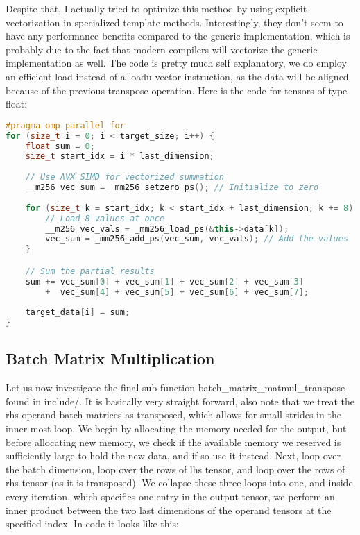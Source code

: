 \documentclass[sigconf]{acmart}
\renewcommand{\texttt}[1]{\begingroup\ttfamily\sloppy\hbadness=10000 #1\endgroup}
\begin{document}
Despite that, I actually tried to optimize this method by using explicit vectorization in specialized template methods. Interestingly, they don't seem to have any performance benefits compared to the generic implementation, which is probably due to the fact that modern compilers will vectorize the generic implementation as well. The code is pretty much self explanatory, we do employ an efficient \texttt{load} instead of a \texttt{loadu} vector instruction, as the data will be aligned because of the previous transpose operation. Here is the code for tensors of type \texttt{float}:

\begin{lstlisting}[language=C++]
#pragma omp parallel for
for (size_t i = 0; i < target_size; i++) {
    float sum = 0;
    size_t start_idx = i * last_dimension;
    
    // Use AVX SIMD for vectorized summation
    __m256 vec_sum = _mm256_setzero_ps(); // Initialize to zero
    
    for (size_t k = start_idx; k < start_idx + last_dimension; k += 8) {
        // Load 8 values at once
        __m256 vec_vals = _mm256_load_ps(&this->data[k]);
        vec_sum = _mm256_add_ps(vec_sum, vec_vals); // Add the values
    }

    // Sum the partial results
    sum += vec_sum[0] + vec_sum[1] + vec_sum[2] + vec_sum[3]
        +  vec_sum[4] + vec_sum[5] + vec_sum[6] + vec_sum[7];
    
    target_data[i] = sum;
}
\end{lstlisting}
\raggedbottom
\subsection{Batch Matrix Multiplication}
Let us now investigate the final sub-function \texttt{batch\_matrix\_matmul\_transpose} found in \texttt{include/}. It is basically very straight forward, also note that we treat the rhs operand batch matrices as transposed, which allows for small strides in the inner most loop. We begin by allocating the memory needed for the output, but before allocating new memory, we check if the available memory we reserved is sufficiently large to hold the new data, and if so use it instead. Next, loop over the batch dimension, loop over the rows of lhs tensor, and loop over the rows of rhs tensor (as it is transposed). We collapse these three loops into one, and inside every iteration, which specifies one entry in the output tensor, we perform an inner product between the two last dimensions of the operand tensors at the specified index. In code it looks like this:
\end{document}
